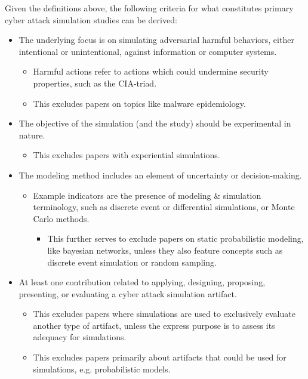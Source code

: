 \documentclass{article}
\begin{document}
Given the definitions above, the following criteria for what constitutes primary cyber attack simulation studies can be derived:
\begin{itemize}
    \item The underlying focus is on simulating adversarial harmful behaviors, either intentional or unintentional, against information or computer systems.
        \begin{itemize}
            \item Harmful actions refer to actions which could undermine security properties, such as the CIA-triad.
        \end{itemize}
        \begin{itemize}
            \item This excludes papers on topics like malware epidemiology.
        \end{itemize}
    \item The objective of the simulation (and the study) should be experimental in nature.
        \begin{itemize}
            \item This excludes papers with experiential simulations.
        \end{itemize}
    \item The modeling method includes an element of uncertainty or decision-making.
        \begin{itemize}
            \item Example indicators are the presence of modeling \& simulation terminology, such as discrete event or differential simulations, or Monte Carlo methods.
                \begin{itemize}
                    \item This further serves to exclude papers on static probabilistic modeling, like bayesian networks, unless they also feature concepts such as discrete event simulation or random sampling.
                \end{itemize}
        \end{itemize}
    \item At least one contribution related to applying, designing, proposing, presenting, or evaluating a cyber attack simulation artifact.
        \begin{itemize}
            \item This excludes papers where simulations are used to exclusively evaluate another type of artifact, unless the express purpose is to assess its adequacy for simulations.
            \item This excludes papers primarily about artifacts that could be used for simulations, e.g. probabilistic models.
        \end{itemize}
\end{itemize}
\end{document}
